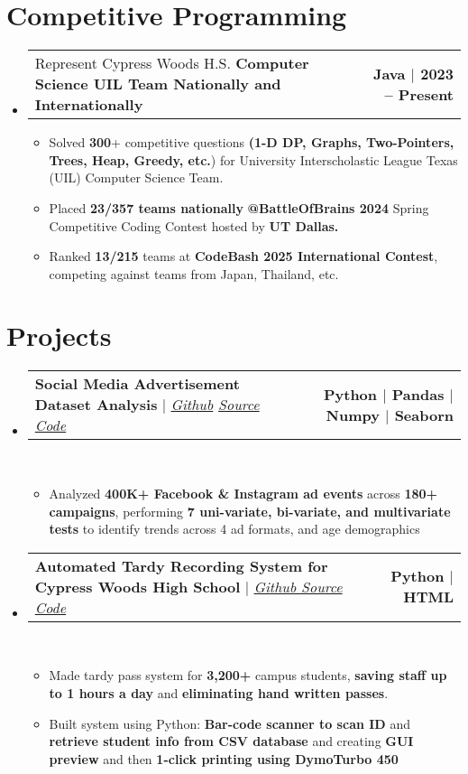 \documentclass[letterpaper,11pt]{article}
\makeatletter
\newcommand{\resumeItem}[1]{
  \item\small{
    {#1 \vspace{0pt}}
  }
}
\newcommand{\resumeProjectHeading}[2]{
    \item
    \begin{tabular*}{1.001\textwidth}{l@{\extracolsep{\fill}}r}
      \small#1 & \textbf{\small #2}\\
    \end{tabular*}\vspace{-7pt}
}
\newcommand{\resumeSubHeadingListStart}{\begin{itemize}[leftmargin=0.0in, label={}]}
\newcommand{\resumeSubHeadingListEnd}{\end{itemize}}\vspace{0pt}
\newcommand{\resumeItemListStart}{\begin{itemize}}
\newcommand{\resumeItemListEnd}{\end{itemize}\vspace{-5pt}}
\makeatother
\begin{document}
\section{Competitive Programming} 
    \vspace{-5pt}
    \resumeSubHeadingListStart
    \resumeProjectHeading
            {Represent Cypress Woods H.S. \textbf{Computer Science UIL Team Nationally and Internationally}}{Java $|$ 2023 -- Present}
          \resumeItemListStart
            \resumeItem{Solved \textbf{300}+ competitive questions \textbf{(1-D DP, Graphs, Two-Pointers, Trees, Heap, Greedy, etc.}) for University Interscholastic League Texas (UIL) Computer Science Team.}
            \resumeItem{Placed \textbf{23/357 teams nationally} \textbf{@BattleOfBrains 2024} Spring Competitive Coding Contest hosted by \textbf{UT Dallas.}}
            \resumeItem{Ranked \textbf{13/215} teams at \textbf{CodeBash 2025 International Contest}, competing against teams from Japan, Thailand, etc.}
          \resumeItemListEnd
\resumeSubHeadingListEnd
\vspace{-25pt}


\section{Projects} 
    \vspace{-5pt}
    \resumeSubHeadingListStart
    \resumeProjectHeading
            {\textbf{{Social Media Advertisement Dataset Analysis}} $|$ \emph{\href{https://github.com/gupta-bananas/social-media-advertisement-data-analysis-insights}{Github} \href{https://github.com/gupta-bananas/social-media-advertisement-data-analysis-insights}{Source Code}}}{Python $|$ Pandas $|$ Numpy $|$ Seaborn}
            \\[5mm]
          \resumeItemListStart
            \resumeItem{Analyzed \textbf{400K+ Facebook \& Instagram ad events} across \textbf{180+ campaigns}, performing \textbf{7 uni-variate, bi-variate, and multivariate tests }to identify trends across 4 ad formats, and  age demographics}
          \resumeItemListEnd
 \vspace{-22pt}
 \resumeProjectHeading
            {\textbf{{Automated Tardy Recording System for Cypress Woods High School}} $|$ \emph{\href{https://github.com/gupta-bananas/eSchool-Tardy-System}{Github Source Code}}}{Python $|$ HTML}
            \\[5mm]
          \resumeItemListStart
            \resumeItem{Made tardy pass system for \textbf{3,200+ }campus students, \textbf{saving staff up to 1 hours a day} and \textbf{eliminating hand written passes}.}
          \resumeItem{Built system using Python: \textbf{Bar-code scanner to scan ID} and \textbf{retrieve student info from CSV database} and creating \textbf{GUI  preview} and then \textbf{1-click printing using DymoTurbo 450}}
          \resumeItemListEnd
\resumeSubHeadingListEnd
\vspace{-15pt}
\end{document}
